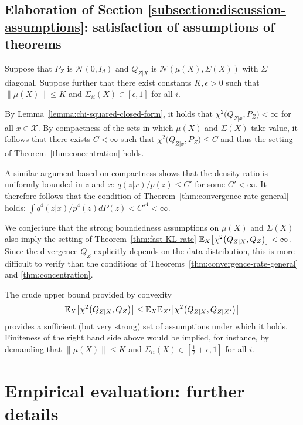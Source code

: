 \subsection{Elaboration of Section \ref{subsection:discussion-assumptions}: satisfaction of assumptions of theorems}\label{appendix:discussion-constraints}

Suppose that ${P_Z}$ is  ${\mathcal{N}\left(0, I_d\right)}$ and ${Q_{Z|X}}$ is  ${\mathcal{N}\left( \mu(X), \Sigma(X)\right)}$ with $\Sigma$ diagonal. 
Suppose further that there exist constants $K, \epsilon > 0$ such that ${\| \mu(X)\| \leq K}$ and ${\Sigma_{ii}(X) \in [\epsilon, 1]}$ for all $i$.

By Lemma~\ref{lemma:chi-squared-closed-form}, it holds that $\chi^2\bigl( Q_{Z|x}, P_Z\bigr) < \infty$ for all $x\in\mathcal{X}$. 
By compactness of the sets in which $\mu(X)$ and $\Sigma(X)$ take value, it follows that there exists $C<\infty$ such that $\chi^2\bigl( Q_{Z|x}, P_Z\bigr) \leq C$ and thus the setting of Theorem~\ref{thm:concentration} holds.

A similar argument based on compactness shows that the density ratio is uniformly bounded in $z$ and $x$: $q(z|x)/p(z) \leq C'$ for some $C'<\infty$. 
It therefore follows that the condition of Theorem~\ref{thm:convergence-rate-general} holds: $\int q^4(z|x)/p^4(z) dP(z) < {C'}^4 < \infty$.

We conjecture that the strong boundedness assumptions on $\mu(X)$ and $\Sigma(X)$ also imply the setting of Theorem~\ref{thm:fast-KL-rate} $\mathbb{E}_{X}\bigl[\chi^2\bigl(Q_{Z|X}, Q_Z\bigr)\bigr] < \infty$.
Since the divergence $Q_Z$ explicitly depends on the data distribution, this is more difficult to verify than the conditions of Theorems~\ref{thm:convergence-rate-general} and \ref{thm:concentration}.

The crude upper bound provided by convexity
\[
\mathbb{E}_{X}\bigl[\chi^2\bigl(Q_{Z|X}, Q_Z\bigr)\bigr] \leq  \mathbb{E}_{X}\mathbb{E}_{X'}\bigl[\chi^2\bigl(Q_{Z|X}, Q_{Z|X'}\bigr)\bigr]
\]
provides a sufficient (but very strong) set of assumptions under which it holds. 
Finiteness of the right hand side above would be implied, for instance, by demanding that ${\| \mu(X)\| \leq K}$ and ${\Sigma_{ii}(X) \in [\frac{1}{2}+\epsilon, 1]}$ for all $i$.



\section{Empirical evaluation: further details}\label{appendix:empirical-evaluation-details}


